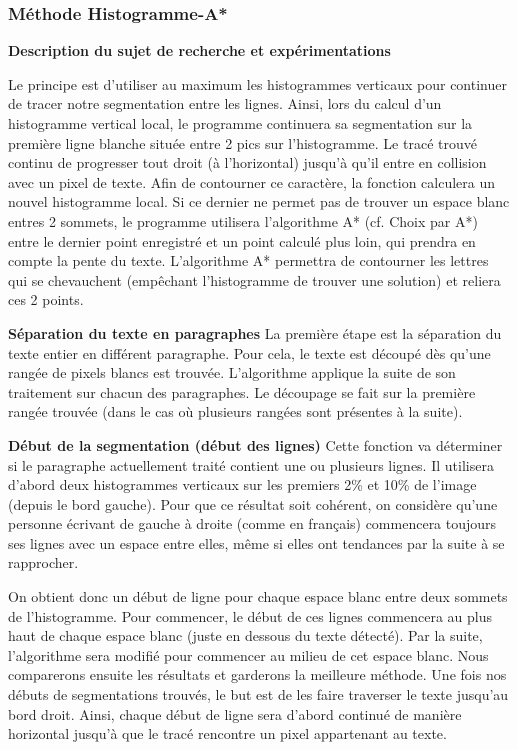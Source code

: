 \documentclass[12pt,a4paper]{article}
\begin{document}
\newpage
\subsubsection{Méthode Histogramme-A*}
\textbf{Description du sujet de recherche et expérimentations}\bigbreak

Le principe est d’utiliser au maximum les histogrammes verticaux pour continuer de tracer notre segmentation entre les lignes. Ainsi, lors du calcul d’un histogramme vertical local, le programme continuera sa segmentation sur la première ligne blanche située entre 2 pics sur l’histogramme. Le tracé trouvé continu de progresser tout droit (à l’horizontal) jusqu’à qu’il entre en collision avec un pixel de texte. Afin de contourner ce caractère, la fonction calculera un nouvel histogramme local.\bigbreak
Si ce dernier ne permet pas de trouver un espace blanc entres 2 sommets, le programme utilisera l’algorithme A* (cf. Choix par A*) entre le dernier point enregistré et un point calculé plus loin, qui prendra en compte la pente du texte. L’algorithme A* permettra de contourner les lettres qui se chevauchent (empêchant l’histogramme de trouver une solution) et reliera ces 2 points.\bigbreak

\bigbreak\textbf{Séparation du texte en paragraphes}\label{texte_en_paragraphe}\bigbreak
La première étape est la séparation du texte entier en différent paragraphe. Pour cela, le texte est découpé dès qu’une rangée de pixels blancs est trouvée.\bigbreak
L’algorithme applique la suite de son traitement sur chacun des paragraphes. Le découpage se fait sur la première rangée trouvée (dans le cas où plusieurs rangées sont présentes à la suite).

\bigbreak\textbf{Début de la segmentation (début des lignes)}\bigbreak
Cette fonction va déterminer si le paragraphe actuellement traité contient une ou plusieurs lignes. Il utilisera d’abord deux histogrammes verticaux sur les premiers 2\% et 10\% de l’image (depuis le bord gauche). Pour que ce résultat soit cohérent, on considère qu’une personne écrivant de gauche à droite (comme en français) commencera toujours ses lignes avec un espace entre elles, même si elles ont tendances par la suite à se rapprocher.


On obtient donc un début de ligne pour chaque espace blanc entre deux sommets de l’histogramme. Pour commencer, le début de ces lignes commencera au plus haut de chaque espace blanc (juste en dessous du texte détecté). Par la suite, l’algorithme sera modifié pour commencer au milieu de cet espace blanc. Nous comparerons ensuite les résultats et garderons la meilleure méthode.\bigbreak
Une fois nos débuts de segmentations trouvés, le but est de les faire traverser le texte jusqu’au bord droit.
Ainsi, chaque début de ligne sera d’abord continué de manière horizontal jusqu’à que le tracé rencontre un pixel appartenant au texte.
\end{document}
